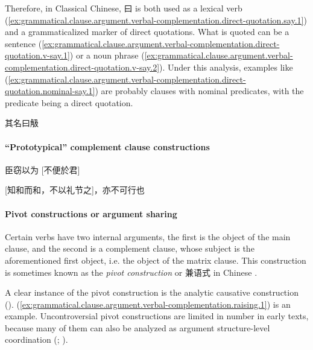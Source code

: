 \documentclass[UTF8, a4paper, oneside, scheme=plain, 12pt]{ctexrep}
\newcommand*{\citepage}[1]{p.~{#1}}
\newcommand*{\term}[1]{\emph{#1}}
\begin{document}
Therefore, in Classical Chinese, 曰 is both used as a lexical verb (\ref{ex:grammatical.clause.argument.verbal-complementation.direct-quotation.say.1})
and a grammaticalized marker of direct quotations.
What is quoted can be a sentence (\ref{ex:grammatical.clause.argument.verbal-complementation.direct-quotation.v-say.1})
or a noun phrase (\ref{ex:grammatical.clause.argument.verbal-complementation.direct-quotation.v-say.2}).
Under this analysis, examples like (\ref{ex:grammatical.clause.argument.verbal-complementation.direct-quotation.nominal-say.1}) are probably clauses with nominal predicates,
with the predicate being a direct quotation.

\begin{exe}
    \ex\label{ex:grammatical.clause.argument.verbal-complementation.direct-quotation.nominal-say.1} 其名曰觙
\end{exe}

\paragraph{``Prototypical'' complement clause constructions}

\begin{exe}
    \ex 臣窃以为 [不便於君]
\end{exe}

\begin{exe}
    \ex {} [知和而和，不以礼节之]，亦不可行也
\end{exe}

\paragraph{Pivot constructions or argument sharing}

Certain verbs have two internal arguments,
the first is the object of the main clause,
and the second is a complement clause, whose subject is the aforementioned first object,
i.e. the object of the matrix clause.
This construction is sometimes known as the \term{pivot construction} \citep[\citepage{40}]{pulleyblank1995outline} or 兼语式 in Chinese \citep[\citepage{375}]{meiguang2018}.

A clear instance of the pivot construction is the analytic causative construction ().
(\ref{ex:grammatical.clause.argument.verbal-complementation.raising.1}) is an example.
Uncontroversial pivot constructions are limited in number in early texts,
because many of them can also be analyzed as argument structure-level coordination
(\citealt[\citepage{376}]{meiguang2018}; ).
\end{document}
